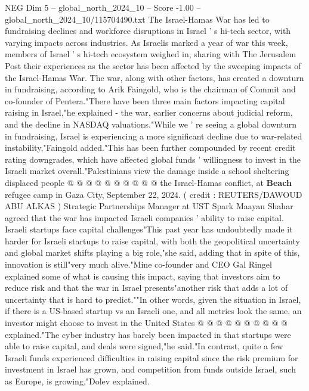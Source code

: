 \begin{textsample}{NEG Dim 5 – global\_north\_2024\_10 – Score -1.00 – global\_north\_2024\_10/115704490.txt}  \label{ex:f5_neg_059}
The Israel-Hamas War has led to fundraising declines and workforce disruptions in Israel ' s hi-tech sector, with varying impacts across industries.
As Israelis marked a year of war this week, members of Israel ' s hi-tech ecosystem weighed in, sharing with The Jerusalem Post their experiences as the sector has been affected by the sweeping impacts of the Israel-Hamas War.
The war, along with other factors, has created a downturn in fundraising, according to Arik Faingold, who is the chairman of Commit and co-founder of Pentera."There have been three main factors impacting capital raising in Israel,"he explained - the war, earlier concerns about judicial reform, and the decline in NASDAQ valuations."While we ' re seeing a global downturn in fundraising, Israel is experiencing a more significant decline due to war-related instability,"Faingold added."This has been further compounded by recent credit rating downgrades, which have affected global funds ' willingness to invest in the Israeli market overall."Palestinians view the damage inside a school sheltering displaced people @ @ @ @ @ @ @ @ @ @ the Israel-Hamas conflict, at \textbf{Beach} refugee camp in Gaza City, September 22, 2024. ( credit : REUTERS/DAWOUD ABU ALKAS ) Strategic Partnerships Manager at UST Spark Maayan Shahar agreed that the war has impacted Israeli companies ' ability to raise capital.
Israeli startups face capital challenges"This past year has undoubtedly made it harder for Israeli startups to raise capital, with both the geopolitical uncertainty and global market shifts playing a big role,"she said, adding that in spite of this, innovation is still"very much alive."Mine co-founder and CEO Gal Ringel explained some of what is causing this impact, saying that investors aim to reduce risk and that the war in Israel presents"another risk that adds a lot of uncertainty that is hard to predict.""In other words, given the situation in Israel, if there is a US-based startup vs an Israeli one, and all metrics look the same, an investor might choose to invest in the United States @ @ @ @ @ @ @ @ @ @ explained."The cyber industry has barely been impacted in that startups were able to raise capital, and deals were signed,"he said."In contrast, quite a few Israeli funds experienced difficulties in raising capital since the risk premium for investment in Israel has grown, and competition from funds outside Israel, such as Europe, is growing,"Dolev explained.

\end{textsample}
